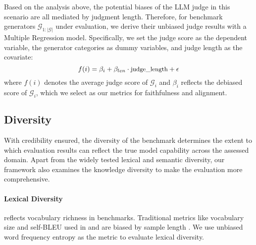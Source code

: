 Based on the analysis above, the potential biases of the LLM judge in this scenario are all mediated by judgment length.
Therefore, for benchmark generators $\mathcal{G}_{1:|\mathcal{G}|}$ under evaluation, we derive their unbiased judge results with a Multiple Regression model. Specifically, we set the judge score as the dependent variable, the generator categories as dummy variables, and judge length as the covariate:
\begin{equation}
\small
f(i) = \beta_i + \beta_{len} \cdot \text{judge\_length}+\epsilon
\label{equation: bias}
\end{equation}
where $f(i)$ denotes the average judge score of $\mathcal{G}_{i}$ and $\beta_i$ reflects the debiased score of $\mathcal{G}_{i}$, which we select as our metrics for faithfulness and alignment.



\subsection{Diversity}
\label{sec:diversity}
With credibility ensured, the diversity of the benchmark determines the extent to which evaluation results can reflect the true model capability across the assessed domain. 
Apart from the widely tested lexical and semantic diversity, our framework also examines the knowledge diversity to make the evaluation more comprehensive.

\paragraph{Lexical Diversity}reflects vocabulary richness in benchmarks. Traditional metrics like vocabulary size and self-BLEU \citep{selfbleu} used in \citet{unigen} and \citep{attr} are biased by sample length \citep{diverbias}. We use unbiased word frequency entropy \citep{entropy} as the metric to evaluate lexical diversity.

